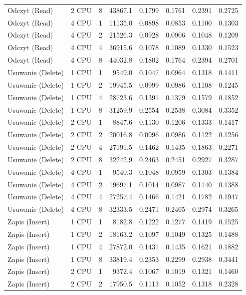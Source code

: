 \begin{table}[ht]
{\begin{tabular}{llcrrrrr}
Odczyt (Read) & 2 CPU & 8 & 43867.1 & 0.1799 & 0.1761 & 0.2391 & 0.2725 \\
Odczyt (Read) & 4 CPU & 1 & 11135.0 & 0.0898 & 0.0853 & 0.1100 & 0.1303 \\
Odczyt (Read) & 4 CPU & 2 & 21526.3 & 0.0928 & 0.0906 & 0.1048 & 0.1209 \\
Odczyt (Read) & 4 CPU & 4 & 36915.6 & 0.1078 & 0.1089 & 0.1330 & 0.1523 \\
Odczyt (Read) & 4 CPU & 8 & 44032.8 & 0.1802 & 0.1764 & 0.2394 & 0.2701 \\
Usuwanie (Delete) & 1 CPU & 1 & 9549.0 & 0.1047 & 0.0964 & 0.1318 & 0.1411 \\
Usuwanie (Delete) & 1 CPU & 2 & 19945.5 & 0.0999 & 0.0986 & 0.1108 & 0.1245 \\
Usuwanie (Delete) & 1 CPU & 4 & 28723.6 & 0.1391 & 0.1379 & 0.1579 & 0.1852 \\
Usuwanie (Delete) & 1 CPU & 8 & 31259.9 & 0.2554 & 0.2538 & 0.3084 & 0.3352 \\
Usuwanie (Delete) & 2 CPU & 1 & 8847.6 & 0.1130 & 0.1206 & 0.1333 & 0.1417 \\
Usuwanie (Delete) & 2 CPU & 2 & 20016.8 & 0.0996 & 0.0986 & 0.1122 & 0.1256 \\
Usuwanie (Delete) & 2 CPU & 4 & 27191.5 & 0.1462 & 0.1435 & 0.1863 & 0.2271 \\
Usuwanie (Delete) & 2 CPU & 8 & 32242.9 & 0.2463 & 0.2451 & 0.2927 & 0.3287 \\
Usuwanie (Delete) & 4 CPU & 1 & 9540.3 & 0.1048 & 0.0959 & 0.1303 & 0.1384 \\
Usuwanie (Delete) & 4 CPU & 2 & 19697.1 & 0.1014 & 0.0987 & 0.1140 & 0.1388 \\
Usuwanie (Delete) & 4 CPU & 4 & 27257.4 & 0.1466 & 0.1421 & 0.1782 & 0.1947 \\
Usuwanie (Delete) & 4 CPU & 8 & 32333.5 & 0.2471 & 0.2465 & 0.2974 & 0.3265 \\
Zapis (Insert) & 1 CPU & 1 & 8182.8 & 0.1222 & 0.1277 & 0.1419 & 0.1525 \\
Zapis (Insert) & 1 CPU & 2 & 18163.2 & 0.1097 & 0.1049 & 0.1325 & 0.1488 \\
Zapis (Insert) & 1 CPU & 4 & 27872.0 & 0.1431 & 0.1435 & 0.1621 & 0.1882 \\
Zapis (Insert) & 1 CPU & 8 & 33819.4 & 0.2353 & 0.2299 & 0.2938 & 0.3441 \\
Zapis (Insert) & 2 CPU & 1 & 9372.4 & 0.1067 & 0.1019 & 0.1321 & 0.1460 \\
Zapis (Insert) & 2 CPU & 2 & 17950.5 & 0.1113 & 0.1052 & 0.1318 & 0.2328 \\

\end{tabular}}
\end{table}

